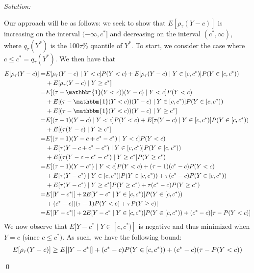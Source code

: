 \documentclass[12pt]{article}
\DeclarePairedDelimiter\abs{\lvert}{\rvert}%
\newenvironment{sol}
    {\emph{Solution:}
    }
    {
    \qed
    }
\begin{document}
\begin{sol}
\begin{enumerate}[label=\alph*) ]
        Our approach will be as follows: we seek to show that $E[\rho_{\tau}(Y - c)]$ is increasing on the interval $(-\infty, c^*]$ and decreasing on the interval $(c^*, \infty)$, where $q_{\tau}(Y^*)$ is the 100$\tau$\% quantile of $Y^*$. To start, we consider the case where $c \leq c^* = q_{\tau}(Y^*)$. We then have that
        \begin{align*}
            E[\rho_{\tau}(Y - c)] =& E[\rho_{\tau}(Y - c) \mid Y < c]P(Y < c) + E[\rho_{\tau}(Y-c) \mid Y \in [c, c^*)]P(Y \in [c, c^*)) \\
            &+ E[\rho_{\tau}(Y-c) \mid Y \geq c^*]\\
            =& E[(\tau - \mathbbm{1}(Y < c))(Y-c)\mid Y < c]P(Y < c) \\&+ E[(\tau - \mathbbm{1}(Y < c))(Y - c) \mid Y \in [c, c^*)]P(Y \in [c, c^*)) \\
            &+ E[(\tau - \mathbbm{1}(Y < c))(Y - c)\mid Y \geq c^*]\\
            =& E[(\tau - 1)(Y-c)\mid Y < c]P(Y < c) + E[\tau(Y - c) \mid Y \in [c, c^*)]P(Y \in [c, c^*)) \\
            &+ E[(\tau(Y - c)\mid Y \geq c^*]\\
            =& E[(\tau -1 )(Y - c+ c^* -c^*) \mid Y < c]P(Y < c) \\&+ E[\tau(Y - c + c^* - c^*) \mid Y \in [c, c^*)]P(Y \in [c, c^*)) \\
            &+  E[(\tau(Y - c + c^* - c^*)\mid Y \geq c^*]P(Y \geq c^*)\\
            =& E[(\tau -1)(Y - c^*) \mid Y < c]P(Y < c) + (\tau-1)(c^* - c)P(Y < c) \\&+ E[\tau(Y - c^*)\mid Y \in [c, c^*)]P(Y \in [c, c^*)) + \tau (c^* - c) P(Y \in [c, c^*)) \\
            &+ E[\tau(Y - c^*) \mid Y \geq c^*]P(Y \geq c^*) + \tau (c^* - c)P(Y \geq c^*)\\
            =& E[\abs{Y - c^*}] + 2 E[Y - c^* \mid Y \in [c, c^*)]P(Y \in [c, c^*)) \\
            &+ (c^* - c)[(\tau - 1) P(Y < c) + \tau P(Y \geq c)]\\
            =& E[\abs{Y - c^*}] + 2 E[Y - c^* \mid Y \in [c, c^*)]P(Y \in [c, c^*)) + (c^* - c)[\tau - P(Y < c)]
        \end{align*}
        We now observe that $E[Y - c^*\mid  Y \in [c, c^*)]$ is negative and thus minimized when $Y = c$ (since $c \leq c^*)$. As such, we have the following bound:
    \begin{align*}
        E[\rho_{\tau}(Y - c)] &\geq  E[\abs{Y - c^*}]  + (c^* - c)P(Y \in [c,c^*)) + (c^* - c)(\tau - P(Y < c))\\

\end{align*}
\end{enumerate}
\end{sol}
\end{document}
